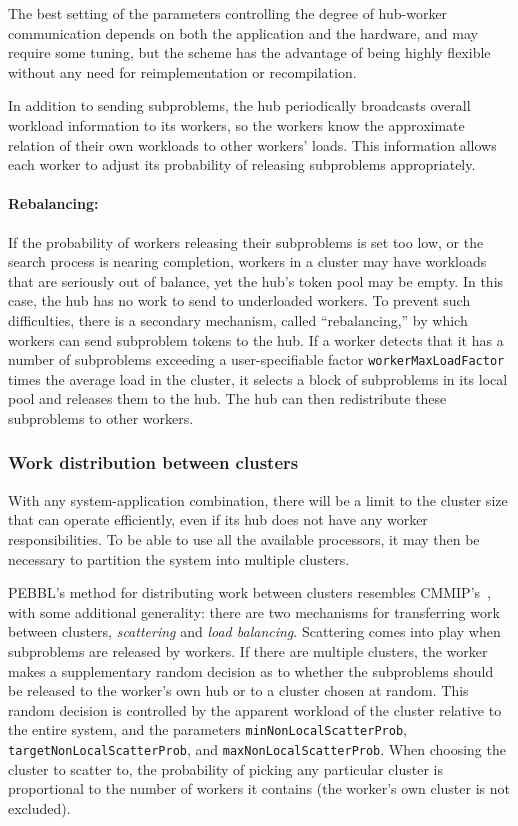 The best setting of the parameters controlling the degree of
hub-worker communication depends on both the application and the
hardware, and may require some tuning, but the scheme has the advantage of
being highly flexible without any need for reimplementation or recompilation.

In addition to sending subproblems, the hub periodically broadcasts
overall workload information to its workers, so the workers know the
approximate relation of their own workloads to other workers' loads.  This
information allows each worker to adjust its probability of releasing
subproblems appropriately.

\paragraph{Rebalancing:}
If the probability of workers releasing their subproblems is set too
low, or the search process is nearing completion, 
workers in a cluster may have workloads that are
seriously out of balance, yet the hub's token pool may be empty.  In this
case, the hub has no work to send to underloaded workers.  To prevent
such difficulties, there is a secondary mechanism, called
``rebalancing,'' by which workers can send subproblem tokens to the
hub.  If a worker detects that it has a number of subproblems
exceeding a user-specifiable factor \texttt{workerMaxLoadFactor} times
the average load in the cluster, it selects a block of subproblems in
its local pool and releases them to the hub.  The hub can then
redistribute these subproblems to other workers.  

\subsubsection{Work distribution between clusters}
\label{sec:betweenclusters}
With any system-application combination, there will be a limit to the
cluster size that can operate efficiently, even if its hub does
not have any worker responsibilities.  To be able to use
all the available processors, it may then be necessary to partition
the system into multiple clusters.

PEBBL's method for distributing work between clusters resembles
CMMIP's~\cite{Eck94,Eck97}, with some additional generality: there are
two mechanisms for transferring work between clusters,
\emph{scattering} and \emph{load balancing}.  Scattering comes into
play when subproblems are released by workers.  If there are multiple
clusters, the worker makes a supplementary random decision as to
whether the subproblems should be released to the worker's own hub or
to a cluster chosen at random.  This random decision is controlled by
the apparent workload of the cluster relative to the entire system,
and the parameters \texttt{minNonLocalScatterProb},
\texttt{targetNonLocalScatterProb}, and
\texttt{maxNonLocalScatterProb}.  When choosing the cluster to scatter
to, the probability of picking any particular cluster is proportional
to the number of workers it contains (the worker's own cluster is
not excluded).

